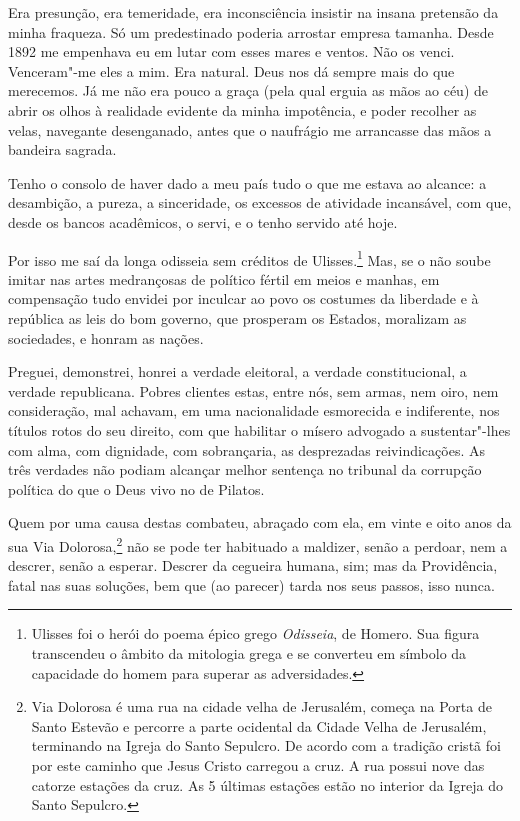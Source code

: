 Era presunção, era temeridade, era inconsciência insistir na
insana pretensão da minha fraqueza. Só um predestinado poderia arrostar
empresa tamanha. Desde 1892 me empenhava eu em lutar com esses mares e
ventos. Não os venci. Venceram"-me eles a mim. Era natural. Deus nos dá
sempre mais do que merecemos. Já me não era pouco a graça (pela qual
erguia as mãos ao céu) de abrir os olhos à realidade evidente da minha
impotência, e poder recolher as velas, navegante desenganado, antes que
o naufrágio me arrancasse das mãos a bandeira sagrada.

Tenho o consolo de haver dado a meu país tudo o que me estava ao
alcance: a desambição, a pureza, a sinceridade, os excessos de
atividade incansável, com que, desde os bancos acadêmicos, o servi, e o
tenho servido até hoje.

Por isso me saí da longa odisseia sem créditos de
Ulisses.\footnote{ Ulisses foi o herói do poema épico grego                           
\textit{Odisseia}, de Homero.  Sua figura transcendeu o âmbito da
mitologia grega e se converteu em símbolo da capacidade do homem para
superar as adversidades.} Mas, se o não soube imitar nas artes
medrançosas de político fértil em meios e manhas, em compensação tudo
envidei por inculcar ao povo os costumes da liberdade e à república as
leis do bom governo, que prosperam os Estados, moralizam as sociedades,
e honram as nações.

Preguei, demonstrei, honrei a verdade eleitoral, a verdade
constitucional, a verdade republicana. Pobres clientes estas, entre
nós, sem armas, nem oiro, nem consideração, mal achavam, em uma
nacionalidade esmorecida e indiferente, nos títulos rotos do seu
direito, com que habilitar o mísero advogado a sustentar"-lhes com alma,
com dignidade, com sobrançaria, as desprezadas reivindicações. As três
verdades não podiam alcançar melhor sentença no tribunal da corrupção
política do que o Deus vivo no de Pilatos.

Quem por uma causa destas combateu, abraçado com ela, em vinte e
oito anos da sua Via Dolorosa,\footnote{ Via Dolorosa é uma
rua na cidade velha de Jerusalém, começa na Porta de
Santo Estevão e percorre a parte ocidental da
Cidade Velha de Jerusalém, terminando na Igreja
do Santo Sepulcro. De acordo com a tradição
cristã foi por este caminho que
Jesus Cristo carregou a
cruz. A rua possui nove das catorze estações da
cruz. As 5 últimas estações estão no interior da
Igreja do Santo
Sepulcro.} não se pode ter habituado a maldizer, senão a
perdoar, nem a descrer, senão a esperar. Descrer da cegueira humana,
sim; mas da Providência, fatal nas suas soluções, bem que (ao parecer)
tarda nos seus passos, isso nunca.

